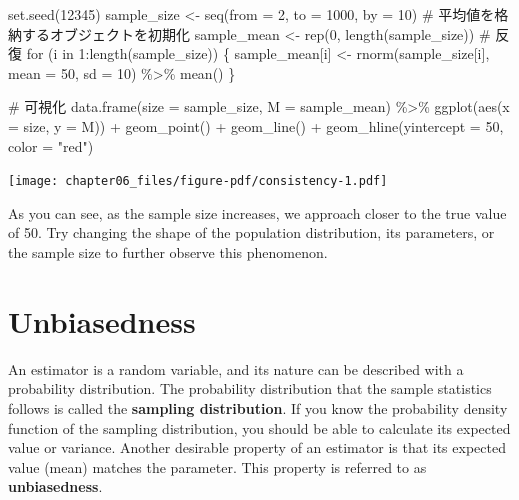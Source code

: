 \documentclass[
  a4paper,
]{book}
\newenvironment{Shaded}{\begin{snugshade}}{\end{snugshade}}
\newcommand{\AttributeTok}[1]{\textcolor[rgb]{0.40,0.45,0.13}{#1}}
\newcommand{\CommentTok}[1]{\textcolor[rgb]{0.37,0.37,0.37}{#1}}
\newcommand{\ControlFlowTok}[1]{\textcolor[rgb]{0.00,0.23,0.31}{#1}}
\newcommand{\DecValTok}[1]{\textcolor[rgb]{0.68,0.00,0.00}{#1}}
\newcommand{\FunctionTok}[1]{\textcolor[rgb]{0.28,0.35,0.67}{#1}}
\newcommand{\NormalTok}[1]{\textcolor[rgb]{0.00,0.23,0.31}{#1}}
\newcommand{\OtherTok}[1]{\textcolor[rgb]{0.00,0.23,0.31}{#1}}
\newcommand{\SpecialCharTok}[1]{\textcolor[rgb]{0.37,0.37,0.37}{#1}}
\newcommand{\StringTok}[1]{\textcolor[rgb]{0.13,0.47,0.30}{#1}}
\begin{document}
\begin{Shaded}
\begin{Highlighting}[]
\FunctionTok{set.seed}\NormalTok{(}\DecValTok{12345}\NormalTok{)}
\NormalTok{sample\_size }\OtherTok{\textless{}{-}} \FunctionTok{seq}\NormalTok{(}\AttributeTok{from =} \DecValTok{2}\NormalTok{, }\AttributeTok{to =} \DecValTok{1000}\NormalTok{, }\AttributeTok{by =} \DecValTok{10}\NormalTok{)}
\CommentTok{\# 平均値を格納するオブジェクトを初期化}
\NormalTok{sample\_mean }\OtherTok{\textless{}{-}} \FunctionTok{rep}\NormalTok{(}\DecValTok{0}\NormalTok{, }\FunctionTok{length}\NormalTok{(sample\_size))}
\CommentTok{\# 反復}
\ControlFlowTok{for}\NormalTok{ (i }\ControlFlowTok{in} \DecValTok{1}\SpecialCharTok{:}\FunctionTok{length}\NormalTok{(sample\_size)) \{}
\NormalTok{  sample\_mean[i] }\OtherTok{\textless{}{-}} \FunctionTok{rnorm}\NormalTok{(sample\_size[i], }\AttributeTok{mean =} \DecValTok{50}\NormalTok{, }\AttributeTok{sd =} \DecValTok{10}\NormalTok{) }\SpecialCharTok{\%\textgreater{}\%}
    \FunctionTok{mean}\NormalTok{()}
\NormalTok{\}}

\CommentTok{\# 可視化}
\FunctionTok{data.frame}\NormalTok{(}\AttributeTok{size =}\NormalTok{ sample\_size, }\AttributeTok{M =}\NormalTok{ sample\_mean) }\SpecialCharTok{\%\textgreater{}\%}
  \FunctionTok{ggplot}\NormalTok{(}\FunctionTok{aes}\NormalTok{(}\AttributeTok{x =}\NormalTok{ size, }\AttributeTok{y =}\NormalTok{ M)) }\SpecialCharTok{+}
  \FunctionTok{geom\_point}\NormalTok{() }\SpecialCharTok{+}
  \FunctionTok{geom\_line}\NormalTok{() }\SpecialCharTok{+}
  \FunctionTok{geom\_hline}\NormalTok{(}\AttributeTok{yintercept =} \DecValTok{50}\NormalTok{, }\AttributeTok{color =} \StringTok{"red"}\NormalTok{)}
\end{Highlighting}
\end{Shaded}

\texttt{[image: chapter06\_files/figure-pdf/consistency-1.pdf]}

As you can see, as the sample size increases, we approach closer to the
true value of 50. Try changing the shape of the population distribution,
its parameters, or the sample size to further observe this phenomenon.

\section{Unbiasedness}\label{unbiasedness}

An estimator is a random variable, and its nature can be described with
a probability distribution. The probability distribution that the sample
statistics follows is called the \textbf{sampling distribution}. If you
know the probability density function of the sampling distribution, you
should be able to calculate its expected value or variance. Another
desirable property of an estimator is that its expected value (mean)
matches the parameter. This property is referred to as
\textbf{unbiasedness}.
\end{document}
